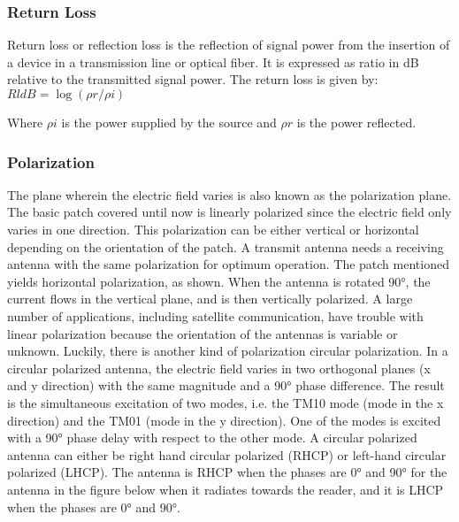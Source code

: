 \documentclass[12pt]{article}
\begin{document}
        \subsubsection{Return Loss}\label{Return Loss}
		 \justify
          Return loss or reflection loss is the reflection of signal power from the insertion of a device in a transmission line or optical fiber. It is expressed as ratio in dB relative to the transmitted signal power.
          The return loss is given by: \newline \newline
          $RldB = \log⁡(\rho {r} / \rho i)$

	      Where $\rho i $  is the power supplied by the source and $\rho r $ is the power reflected.


          \subsubsection{Polarization}\label{sub:Polarization}
           \justify
            The plane wherein the electric field varies is also known as the polarization plane. The
            basic patch covered until now is linearly polarized since the electric field only varies in one
            direction. This polarization can be either vertical or horizontal depending on the orientation of the patch. A transmit antenna needs a receiving antenna with the same polarization for optimum operation. The patch mentioned yields horizontal polarization, as shown. When the antenna is rotated 90°, the current flows in the vertical plane, and is then vertically polarized. A large number of applications, including satellite communication, have trouble with linear polarization because the orientation of the antennas is variable or unknown. Luckily, there is another kind of polarization circular polarization. In a circular polarized antenna, the electric field varies in two orthogonal planes (x and y direction) with the same magnitude and a 90° phase difference. The result is the simultaneous excitation of two modes, i.e. the TM10 mode (mode in the x direction) and the TM01 (mode in the y direction). One of the modes is excited with a 90° phase delay with respect to the other mode. A circular polarized antenna can either be right hand circular polarized (RHCP) or left-hand circular polarized (LHCP). The antenna is RHCP when the phases are 0° and 90° for the antenna in the figure below when it radiates towards the reader, and it is LHCP when the phases are 0° and 90°.
\end{document}
